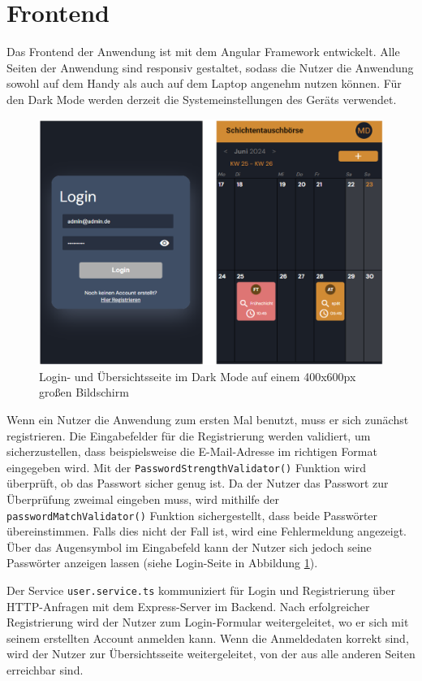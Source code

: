 \section{Frontend}
Das Frontend der Anwendung ist mit dem Angular Framework entwickelt. 
Alle Seiten der Anwendung sind responsiv gestaltet, sodass die Nutzer die Anwendung sowohl auf dem Handy als auch auf dem Laptop angenehm nutzen können. 
Für den Dark Mode werden derzeit die Systemeinstellungen des Geräts verwendet.

\begin{figure}[h]
    \centering
    \includegraphics[clip,width=0.65\linewidth]{images/Login_Home_dark.png}
    \caption[Login- und Übersichtsseite im Dark Mode auf einem 400x600px großen Bildschirm]{Login- und Übersichtsseite im Dark Mode auf einem 400x600px großen Bildschirm}
    \label{Login_Home_dark}
\end{figure}

Wenn ein Nutzer die Anwendung zum ersten Mal benutzt, muss er sich zunächst registrieren. 
Die Eingabefelder für die Registrierung werden validiert, um sicherzustellen, dass beispielsweise die E-Mail-Adresse im richtigen Format eingegeben wird. 
Mit der \texttt{PasswordStrengthValidator()} Funktion wird überprüft, ob das Passwort sicher genug ist. 
Da der Nutzer das Passwort zur Überprüfung zweimal eingeben muss, wird mithilfe der \texttt{passwordMatchValidator()} Funktion sichergestellt, dass beide Passwörter übereinstimmen. 
Falls dies nicht der Fall ist, wird eine Fehlermeldung angezeigt. 
Über das Augensymbol im Eingabefeld kann der Nutzer sich jedoch seine Passwörter anzeigen lassen (siehe Login-Seite in Abbildung \ref{Login_Home_dark}).

Der Service \texttt{user.service.ts} kommuniziert für Login und Registrierung über HTTP-Anfragen mit dem Express-Server im Backend. 
Nach erfolgreicher Registrierung wird der Nutzer zum Login-Formular weitergeleitet, wo er sich mit seinem erstellten Account anmelden kann. 
Wenn die Anmeldedaten korrekt sind, wird der Nutzer zur Übersichtsseite weitergeleitet, von der aus alle anderen Seiten erreichbar sind.

